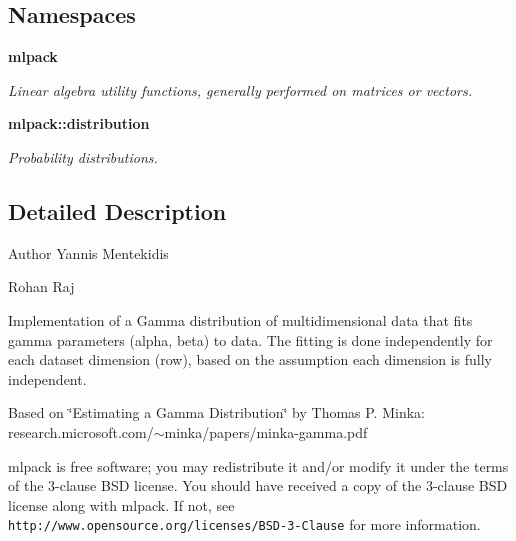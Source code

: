 \subsection*{Namespaces}
\begin{DoxyCompactItemize}
\item 
 \textbf{ mlpack}
\begin{DoxyCompactList}\small\item\em Linear algebra utility functions, generally performed on matrices or vectors. \end{DoxyCompactList}\item 
 \textbf{ mlpack\+::distribution}
\begin{DoxyCompactList}\small\item\em Probability distributions. \end{DoxyCompactList}\end{DoxyCompactItemize}


\subsection{Detailed Description}
\begin{DoxyAuthor}{Author}
Yannis Mentekidis 

Rohan Raj
\end{DoxyAuthor}
Implementation of a Gamma distribution of multidimensional data that fits gamma parameters (alpha, beta) to data. The fitting is done independently for each dataset dimension (row), based on the assumption each dimension is fully independent.

Based on \char`\"{}\+Estimating a Gamma Distribution\char`\"{} by Thomas P. Minka\+: research.\+microsoft.\+com/$\sim$minka/papers/minka-\/gamma.pdf

mlpack is free software; you may redistribute it and/or modify it under the terms of the 3-\/clause B\+SD license. You should have received a copy of the 3-\/clause B\+SD license along with mlpack. If not, see {\tt http\+://www.\+opensource.\+org/licenses/\+B\+S\+D-\/3-\/\+Clause} for more information. 